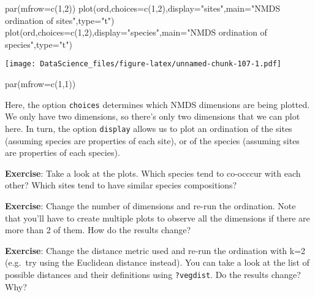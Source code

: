 \documentclass[
]{book}
\newenvironment{Shaded}{\begin{snugshade}}{\end{snugshade}}
\newcommand{\AttributeTok}[1]{\textcolor[rgb]{0.77,0.63,0.00}{#1}}
\newcommand{\DecValTok}[1]{\textcolor[rgb]{0.00,0.00,0.81}{#1}}
\newcommand{\FunctionTok}[1]{\textcolor[rgb]{0.00,0.00,0.00}{#1}}
\newcommand{\NormalTok}[1]{#1}
\newcommand{\StringTok}[1]{\textcolor[rgb]{0.31,0.60,0.02}{#1}}
\begin{document}
\begin{Shaded}
\begin{Highlighting}[]
\FunctionTok{par}\NormalTok{(}\AttributeTok{mfrow=}\FunctionTok{c}\NormalTok{(}\DecValTok{1}\NormalTok{,}\DecValTok{2}\NormalTok{))}
\FunctionTok{plot}\NormalTok{(ord,}\AttributeTok{choices=}\FunctionTok{c}\NormalTok{(}\DecValTok{1}\NormalTok{,}\DecValTok{2}\NormalTok{),}\AttributeTok{display=}\StringTok{"sites"}\NormalTok{,}\AttributeTok{main=}\StringTok{"NMDS ordination of sites"}\NormalTok{,}\AttributeTok{type=}\StringTok{"t"}\NormalTok{)}
\FunctionTok{plot}\NormalTok{(ord,}\AttributeTok{choices=}\FunctionTok{c}\NormalTok{(}\DecValTok{1}\NormalTok{,}\DecValTok{2}\NormalTok{),}\AttributeTok{display=}\StringTok{"species"}\NormalTok{,}\AttributeTok{main=}\StringTok{"NMDS ordination of species"}\NormalTok{,}\AttributeTok{type=}\StringTok{"t"}\NormalTok{)}
\end{Highlighting}
\end{Shaded}

\texttt{[image: DataScience\_files/figure-latex/unnamed-chunk-107-1.pdf]}

\begin{Shaded}
\begin{Highlighting}[]
\FunctionTok{par}\NormalTok{(}\AttributeTok{mfrow=}\FunctionTok{c}\NormalTok{(}\DecValTok{1}\NormalTok{,}\DecValTok{1}\NormalTok{))}
\end{Highlighting}
\end{Shaded}

Here, the option \texttt{choices} determines which NMDS dimensions are being plotted. We only have two dimensions, so there's only two dimensions that we can plot here. In turn, the option \texttt{display} allows us to plot an ordination of the sites (assuming species are properties of each site), or of the species (assuming sites are properties of each species).

\textbf{Exercise}: Take a look at the plots. Which species tend to co-occcur with each other? Which sites tend to have similar species compositions?

\textbf{Exercise}: Change the number of dimensions and re-run the ordination. Note that you'll have to create multiple plots to observe all the dimensions if there are more than 2 of them. How do the results change?

\textbf{Exercise}: Change the distance metric used and re-run the ordination with k=2 (e.g.~try using the Euclidean distance instead). You can take a look at the list of possible distances and their definitions using \texttt{?vegdist}. Do the results change? Why?
\end{document}
